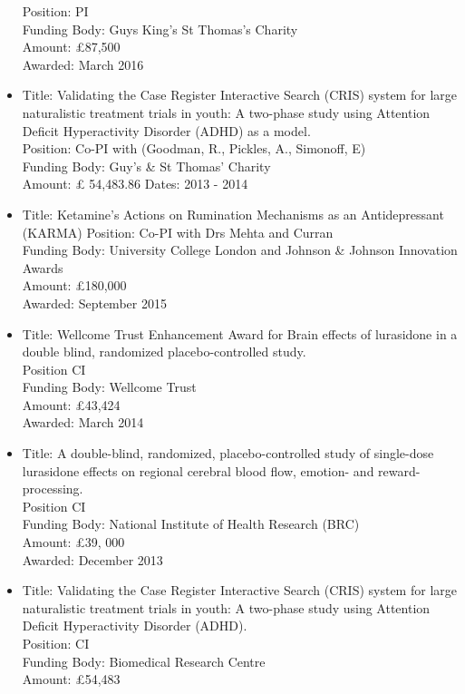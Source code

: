 \documentclass[
]{article}
\begin{document}
\begin{itemize}
  Position: PI\\
  Funding Body: Guys King's St Thomas's Charity\\
  Amount: £87,500\\
  Awarded: March 2016
\item
  Title: Validating the Case Register Interactive Search (CRIS) system
  for large naturalistic treatment trials in youth: A two-phase study
  using Attention Deficit Hyperactivity Disorder (ADHD) as a model.\\
  Position: Co-PI with (Goodman, R., Pickles, A., Simonoff, E)\\
  Funding Body: Guy's \& St Thomas' Charity\\
  Amount: £ 54,483.86 Dates: 2013 - 2014
\item
  Title: Ketamine's Actions on Rumination Mechanisms as an
  Antidepressant (KARMA) Position: Co-PI with Drs Mehta and Curran\\
  Funding Body: University College London and Johnson \& Johnson
  Innovation Awards\\
  Amount: £180,000\\
  Awarded: September 2015
\item
  Title: Wellcome Trust Enhancement Award for Brain effects of
  lurasidone in a double blind, randomized placebo-controlled study.\\
  Position CI\\
  Funding Body: Wellcome Trust\\
  Amount: £43,424\\
  Awarded: March 2014
\item
  Title: A double-blind, randomized, placebo-controlled study of
  single-dose lurasidone effects on regional cerebral blood flow,
  emotion- and reward-processing.\\
  Position CI\\
  Funding Body: National Institute of Health Research (BRC)\\
  Amount: £39, 000\\
  Awarded: December 2013
\item
  Title: Validating the Case Register Interactive Search (CRIS) system
  for large naturalistic treatment trials in youth: A two-phase study
  using Attention Deficit Hyperactivity Disorder (ADHD).\\
  Position: CI\\
  Funding Body: Biomedical Research Centre\\
  Amount: £54,483\\

\end{itemize}
\end{document}
